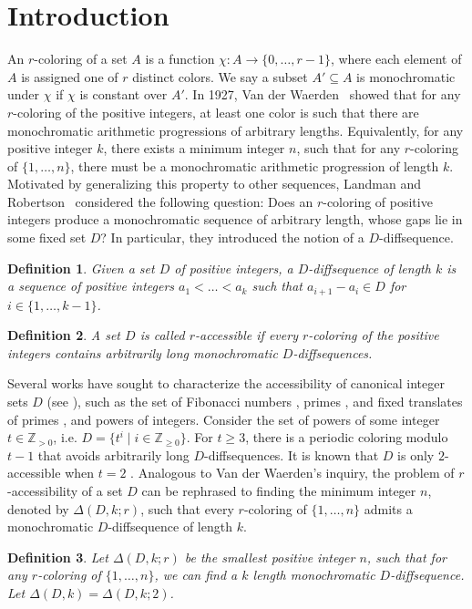 \documentclass[11pt]{article}
\newtheorem{definition}{Definition}
\begin{document}
\section{Introduction}
An $r$-coloring of a set $A$ is a function $\chi : A \to \{0, \ldots, r-1\}$, where each element of $A$ is assigned one of $r$ distinct colors. We say a subset $A' \subseteq A$ is monochromatic under $\chi$ if $\chi$ is constant over $A'$. In 1927, Van der Waerden~\cite{Waerdan} showed that for any $r$-coloring of the positive integers, at least one color is such that there are monochromatic arithmetic progressions of arbitrary lengths. Equivalently, for any positive integer $k$, there exists a minimum integer $n$, such that for any $r$-coloring of $\{1,\ldots, n \}$, there must be a monochromatic arithmetic progression of length $k$. Motivated by generalizing this property to other sequences, Landman and Robertson~\cite{LR} considered the following question: Does an $r$-coloring of positive integers produce a monochromatic sequence of arbitrary length, whose gaps lie in some fixed set $D$? In particular, they introduced the notion of a $D$-diffsequence.
\begin{definition}
    Given a set $D$ of positive integers, a $D$-\textit{diffsequence} of length $k$ is a sequence of positive integers $a_1 < \dots < a_k$ such that $a_{i+1}-a_i\in D$ for $i \in \{1,\dots,k-1\}$.
\end{definition}
\begin{definition}
    A set $D$ is called $r$-accessible if every $r$-coloring of the positive integers contains arbitrarily long monochromatic $D$-diffsequences.
\end{definition}
Several works have sought to characterize the accessibility of canonical integer sets $D$ (see \cite{book}), such as the set of Fibonacci numbers \cite{LR, Wesley}, primes \cite{LR}, and fixed translates of primes \cite{LV10}, and powers of integers. Consider the set of powers of some integer $t \in \mathbb{Z}_{> 0}$, i.e. $D = \{ t^{i}   \mid i \in \mathbb{Z}_{\ge 0}\}$. For $t\ge 3$, there is a periodic coloring modulo $t-1$ that avoids arbitrarily long $D$-diffsequences. It is known that $D$ is only $2$-accessible when $t = 2$ \cite{book}. Analogous to Van der Waerden's inquiry, the problem of $r$-accessibility of a set $D$ can be rephrased to finding the minimum integer $n$, denoted by $\Delta(D,k;r)$, such that every $r$-coloring of $\{1, \ldots, n\}$ admits a monochromatic $D$-diffsequence of length $k$. 

\begin{definition}
    Let $\Delta(D,k;r)$ be the smallest positive integer $n$, such that for any $r$-coloring of $\{1, \ldots, n \}$, we can find a $k$ length monochromatic $D$-diffsequence. Let $\Delta(D,k) = \Delta(D,k;2)$.
\end{definition}
\end{document}
